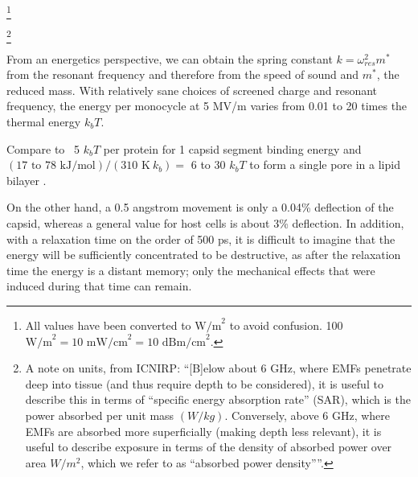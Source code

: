 \documentclass[paper.tex]{subfiles}
\begin{document}
\begin{multicols}{1}
\footnote{All values have been converted to $\text{W/m}^2$ to avoid confusion. 100 $\text{W/m}^2 = 10 \text{ mW/cm}^2 = 10 \text{ dBm/cm}^2$.}


%
%
%
%
%
%
%
%
%
%
%




\footnote{A note on units, from ICNIRP: ``{[B]elow about 6 GHz, where EMFs penetrate deep into tissue (and thus require depth to be considered), it is useful to describe this in terms of “specific energy absorption rate” (SAR), which is the power absorbed per unit mass $(W/kg)$. Conversely, above 6 GHz, where EMFs are absorbed more superficially (making depth less relevant), it is useful to describe exposure in terms of the density of absorbed power over area $W/m^2$, which we refer to as “absorbed power density”}''. }



 
From an energetics perspective, we can obtain the spring constant $k = \omega_{res}^2 m^*$ from the resonant frequency and therefore from the speed of sound and $m^*$, the reduced mass. With relatively sane choices of screened charge and resonant frequency, the energy per monocycle at 5 MV/m varies from 0.01 to 20 times the thermal energy $k_b T$. 

Compare to ~5 $k_b T$ per protein for 1 capsid segment binding energy \cite{Energies2012} \cite{Weak2002} and $ (\text{17 to 78 kJ/mol})  / (310 \text{ K}\ k_b) = $ 6 to 30 $k_b T$ to form a single pore in a lipid bilayer \cite{Atomistic2014a}.

On the other hand, a 0.5 angstrom movement is only a 0.04\% deflection of the capsid, whereas a general value for host cells is about 3\% deflection. In addition, with a relaxation time on the order of 500 ps, it is difficult to imagine that the energy will be sufficiently concentrated to be destructive, as after the relaxation time the energy is a distant memory; only the mechanical effects that were induced during that time can remain.


\end{multicols}
\end{document}
